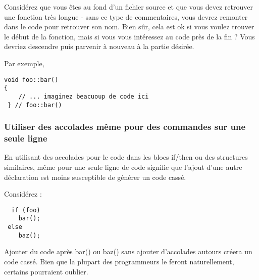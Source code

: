 Considérez que vous êtes au fond d'un fichier source et que vous devez retrouver une fonction très longue - sans ce type de commentaires, vous devrez remonter dans le code pour retrouver son nom. Bien sûr, cela est ok si vous voulez trouver le début de la fonction, mais si vous vous intéressez au code près de la fin ? Vous devriez descendre puis parvenir à nouveau à la partie désirée.

Par exemple,

\begin{verbatim}
void foo::bar()
{ 
    // ... imaginez beacuoup de code ici
 } // foo::bar()
\end{verbatim}

\subsubsection{Utiliser des accolades même pour des commandes sur une seule ligne}
En utilisant des accolades pour le code dans les blocs if/then ou des structures similaires, même pour une seule ligne de code signifie que l'ajout d'une autre déclaration est moins susceptible de générer un code cassé.

Considérez :

\begin{verbatim}
  if (foo)
    bar();
 else
    baz();
\end{verbatim}

Ajouter du code après bar() ou baz() sans ajouter d'accolades autours créera un code cassé. Bien que la plupart des programmeurs le feront naturellement, certains pourraient oublier.

